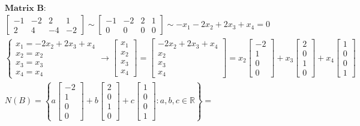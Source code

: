 \documentclass{article}
\begin{document}
\begin{align*}
\\
&\textbf{Matrix B:}
\\
&\begin{bmatrix} -1 & -2 & 2 & 1 \\ 2 & 4 & -4 & -2 \end{bmatrix} \sim
\begin{bmatrix} -1 & -2 & 2 & 1 \\ 0 & 0 & 0 & 0 \end{bmatrix} \sim
-x_{1} - 2x_{2} + 2x_{3} + x_{4} = 0
\\
&\begin{cases} x_{1} = -2x_{2} + 2x_{3} + x_{4} \\ x_{2} = x_{2} \\ x_{3} = x_{3} \\ x_{4} = x_{4} \end{cases} \rightarrow
\begin{bmatrix} x_{1} \\ x_{2} \\ x_{3} \\ x_{4} \end{bmatrix} =
\begin{bmatrix} -2x_{2} + 2x_{3} + x_{4} \\ x_{2} \\ x_{3} \\ x_{4} \end{bmatrix}
=
x_{2}\begin{bmatrix} -2 \\ 1 \\ 0 \\ 0 \end{bmatrix} + x_{3}\begin{bmatrix} 2 \\ 0 \\ 1 \\ 0 \end{bmatrix} + x_{4}\begin{bmatrix} 1 \\ 0 \\ 0 \\ 1 \end{bmatrix}
\\
&N(B) = \left\{a\begin{bmatrix} -2 \\ 1 \\ 0 \\ 0 \end{bmatrix} + b\begin{bmatrix} 2 \\ 0 \\ 1 \\ 0 \end{bmatrix} + c\begin{bmatrix} 1 \\ 0 \\ 0 \\ 1 \end{bmatrix} : a,b,c \in \mathbb{R}\right\} =

\end{align*}
\end{document}

